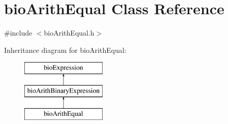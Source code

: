 \hypertarget{classbio_arith_equal}{}\section{bio\+Arith\+Equal Class Reference}
\label{classbio_arith_equal}


{\ttfamily \#include $<$bio\+Arith\+Equal.\+h$>$}

Inheritance diagram for bio\+Arith\+Equal\+:\begin{figure}[H]
\begin{center}
\leavevmode
\includegraphics[height=3.000000cm]{classbio_arith_equal}
\end{center}
\end{figure}
